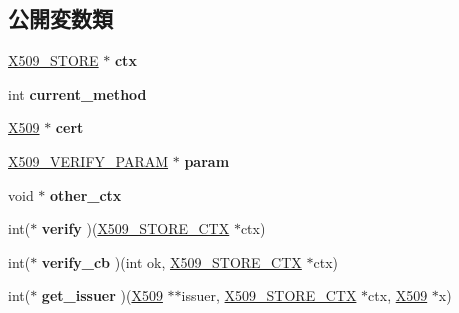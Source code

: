\subsection*{公開変数類}
\begin{DoxyCompactItemize}
\item 
\hypertarget{structx509__store__ctx__st_ac633a0b046f10408d0becf0f1732ede5}{}\hyperlink{structx509__store__st}{X509\+\_\+\+S\+T\+O\+R\+E} $\ast$ {\bfseries ctx}\label{structx509__store__ctx__st_ac633a0b046f10408d0becf0f1732ede5}

\item 
\hypertarget{structx509__store__ctx__st_a1bbea1b86bcb3d3f1a7d0bb05e67e860}{}int {\bfseries current\+\_\+method}\label{structx509__store__ctx__st_a1bbea1b86bcb3d3f1a7d0bb05e67e860}

\item 
\hypertarget{structx509__store__ctx__st_aaf9dd5eda06f69f1a8b9f7606ee5c9b1}{}\hyperlink{structx509__st}{X509} $\ast$ {\bfseries cert}\label{structx509__store__ctx__st_aaf9dd5eda06f69f1a8b9f7606ee5c9b1}

\item 
\hypertarget{structx509__store__ctx__st_aacc66808b8d950db3d83395fdcd985b4}{}\hyperlink{struct_x509___v_e_r_i_f_y___p_a_r_a_m__st}{X509\+\_\+\+V\+E\+R\+I\+F\+Y\+\_\+\+P\+A\+R\+A\+M} $\ast$ {\bfseries param}\label{structx509__store__ctx__st_aacc66808b8d950db3d83395fdcd985b4}

\item 
\hypertarget{structx509__store__ctx__st_ab5ca1f66ed3e28f30ec7dc4df63ae78d}{}void $\ast$ {\bfseries other\+\_\+ctx}\label{structx509__store__ctx__st_ab5ca1f66ed3e28f30ec7dc4df63ae78d}

\item 
\hypertarget{structx509__store__ctx__st_a40f028b2c848dc8df554ab89ac562fd1}{}int($\ast$ {\bfseries verify} )(\hyperlink{structx509__store__ctx__st}{X509\+\_\+\+S\+T\+O\+R\+E\+\_\+\+C\+T\+X} $\ast$ctx)\label{structx509__store__ctx__st_a40f028b2c848dc8df554ab89ac562fd1}

\item 
\hypertarget{structx509__store__ctx__st_a07d959e3a0cb959ec7c39bd7b8ee76eb}{}int($\ast$ {\bfseries verify\+\_\+cb} )(int ok, \hyperlink{structx509__store__ctx__st}{X509\+\_\+\+S\+T\+O\+R\+E\+\_\+\+C\+T\+X} $\ast$ctx)\label{structx509__store__ctx__st_a07d959e3a0cb959ec7c39bd7b8ee76eb}

\item 
\hypertarget{structx509__store__ctx__st_a5374f462a245a61de3aa7a7ccf18ddb9}{}int($\ast$ {\bfseries get\+\_\+issuer} )(\hyperlink{structx509__st}{X509} $\ast$$\ast$issuer, \hyperlink{structx509__store__ctx__st}{X509\+\_\+\+S\+T\+O\+R\+E\+\_\+\+C\+T\+X} $\ast$ctx, \hyperlink{structx509__st}{X509} $\ast$x)\label{structx509__store__ctx__st_a5374f462a245a61de3aa7a7ccf18ddb9}


\end{DoxyCompactItemize}
